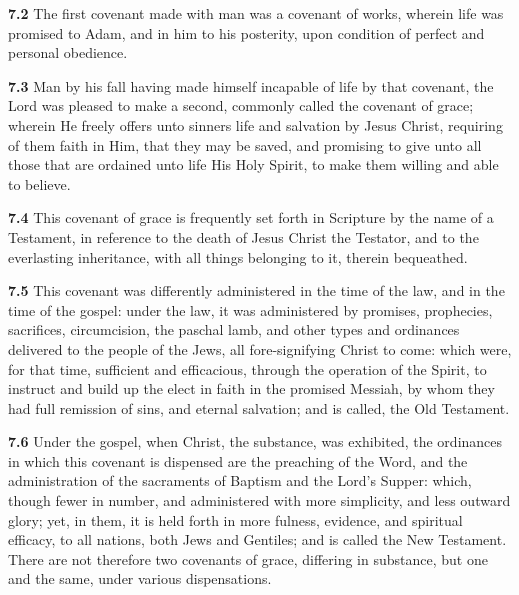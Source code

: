 \par\textbf{7.2} The first covenant made with man was a covenant of works, wherein life was promised to Adam, and in him to his posterity, upon condition of perfect and personal obedience.   

\par\textbf{7.3} Man by his fall having made himself incapable of life by that covenant, the Lord was pleased to make a second, commonly called the covenant of grace; wherein He freely offers unto sinners life and salvation by Jesus Christ, requiring of them faith in Him, that they may be saved, and promising to give unto all those that are ordained unto life His Holy Spirit, to make them willing and able to believe.   

\par\textbf{7.4} This covenant of grace is frequently set forth in Scripture by the name of a Testament, in reference to the death of Jesus Christ the Testator, and to the everlasting inheritance, with all things belonging to it, therein bequeathed.   

\par\textbf{7.5} This covenant was differently administered in the time of the law, and in the time of the gospel: under the law, it was administered by promises, prophecies, sacrifices, circumcision, the paschal lamb, and other types and ordinances delivered to the people of the Jews, all fore-signifying Christ to come: which were, for that time, sufficient and efficacious, through the operation of the Spirit, to instruct and build up the elect in faith in the promised Messiah, by whom they had full remission of sins, and eternal salvation; and is called, the Old Testament.   

\par\textbf{7.6} Under the gospel, when Christ, the substance, was exhibited, the ordinances in which this covenant is dispensed are the preaching of the Word, and the administration of the sacraments of Baptism and the Lord's Supper: which, though fewer in number, and administered with more simplicity, and less outward glory; yet, in them, it is held forth in more fulness, evidence, and spiritual efficacy, to all nations, both Jews and Gentiles; and is called the New Testament. There are not therefore two covenants of grace, differing in substance, but one and the same, under various dispensations.  

